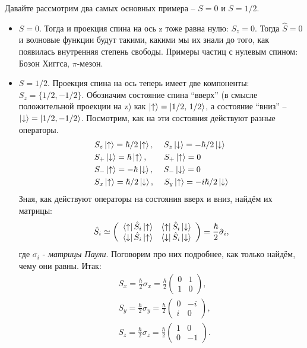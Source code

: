 Давайте рассмотрим два самых основных примера -- $S = 0$ и $S = 1/2$.
\begin{itemize}
    \item $S = 0$. Тогда и проекция спина на ось z тоже равна нулю: $S_z = 0$. Тогда $\hat{S} = 0$ и волновые функции будут такими, какими мы их знали до того, как появилась внутренняя степень свободы. Примеры частиц с нулевым спином: Бозон Хиггса, $\pi$-мезон.
    \item $S = 1/2$. Проекция спина на ось теперь имеет две компоненты: $S_z = \{1/2, -1/2\}$. Обозначим состояние спина ``вверх'' (в смысле положительной проекции на z) как $\ket{\uparrow} = \ket{1/2,\, 1/2}$, а состояние ``вниз'' -- $\ket{\downarrow} = \ket{1/2, -1/2}$. Посмотрим, как на эти состояния действуют разные операторы.
    \begin{align*}
        &S_z\ket{\uparrow} = \hbar/2\ket{\uparrow}, \quad\, S_z\ket{\downarrow} = -\hbar/2 \ket{\downarrow}\\
        &S_+\ket{\downarrow} = \hbar\ket{\uparrow},\qquad S_+\ket{\uparrow} = 0\\
        &S_-\ket{\uparrow} = -\hbar\ket{\downarrow},\quad\, S_-\ket{\downarrow} = 0\\
        &S_x\ket{\uparrow} =\hbar/2\ket{\downarrow}, \quad\, S_y\ket{\uparrow} =-i\hbar/2\ket{\downarrow}
    \end{align*}
    Зная, как действуют операторы на состояния вверх и вниз, найдём их матрицы:
    \[
    \hat{S}_i \simeq \left(\begin{array}{cc}
        \bra{\uparrow}\hat{S}_i\ket{\uparrow} & \bra{\uparrow}\hat{S}_i\ket{\downarrow} \\
        \bra{\downarrow}\hat{S}_i\ket{\uparrow}  & \bra{\downarrow}\hat{S}_i\ket{\downarrow}
    \end{array}
    \right) = \frac{\hbar}{2}\hat{\sigma}_i,
    \]
    где $\sigma_i$ - \textit{матрицы Паули}. Поговорим про них подробнее, как только найдём, чему они равны. Итак:
    \begin{align*}
    &S_x = \frac{\hbar}{2}\sigma_x = \frac{\hbar}{2}\left(\begin{array}{cc} 0 & 1\\ 1 & 0 \end{array}\right),\\
    &S_y = \frac{\hbar}{2}\sigma_y = \frac{\hbar}{2}\left(\begin{array}{cc} 0 & -i\\ i & 0 \end{array}\right),\\
    &S_z = \frac{\hbar}{2}\sigma_z = \frac{\hbar}{2}\left(\begin{array}{cc} 1 & 0\\ 0 & -1 \end{array}\right).
    \end{align*}
\end{itemize}

